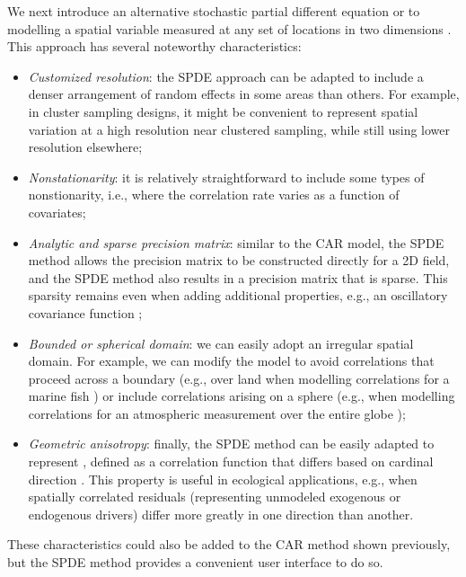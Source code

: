 We next introduce an alternative stochastic partial different equation or  to modelling a spatial variable measured at any set of locations in two dimensions \cite{bakka_spatial_2018,lindgren_explicit_2011}.  This approach has several noteworthy characteristics:
\begin{itemize}
    \item \textit{Customized resolution}:  the SPDE approach can be adapted to include a denser arrangement of random effects in some areas than others.  For example, in cluster sampling designs, it might be convenient to represent spatial variation at a high resolution near clustered sampling, while still using lower resolution elsewhere;

    \item \textit{Nonstationarity}:  it is relatively straightforward to include some types of nonstionarity, i.e., where the correlation rate varies as a function of covariates;

    \item \textit{Analytic and sparse precision matrix}:  similar to the CAR model, the SPDE method allows the precision matrix to be constructed directly for a 2D field, and the SPDE method also results in a precision matrix that is sparse.  This sparsity remains even when adding additional properties, e.g., an oscillatory covariance function \cite{lindgren_explicit_2011}; 

   \item \textit{Bounded or spherical domain}: we can easily adopt an irregular spatial domain.  For example, we can modify the model to avoid correlations that proceed across a boundary (e.g., over land when modelling correlations for a marine fish \cite{bakka_non-stationary_2019}) or include correlations arising on a sphere (e.g., when modelling correlations for an atmospheric measurement over the entire globe \cite{lindgren_explicit_2011});    
   
   \item \textit{Geometric anisotropy}:  finally, the SPDE method can be easily adapted to represent , defined as a correlation function that differs based on cardinal direction \cite{lindgren_explicit_2011,thorson_geostatistical_2015}.  This property is useful in ecological applications, e.g., when spatially correlated residuals (representing unmodeled exogenous or endogenous drivers) differ more greatly in one direction than another.
\end{itemize}
These characteristics could also be added to the CAR method shown previously, but the SPDE method provides a convenient user interface to do so.  

